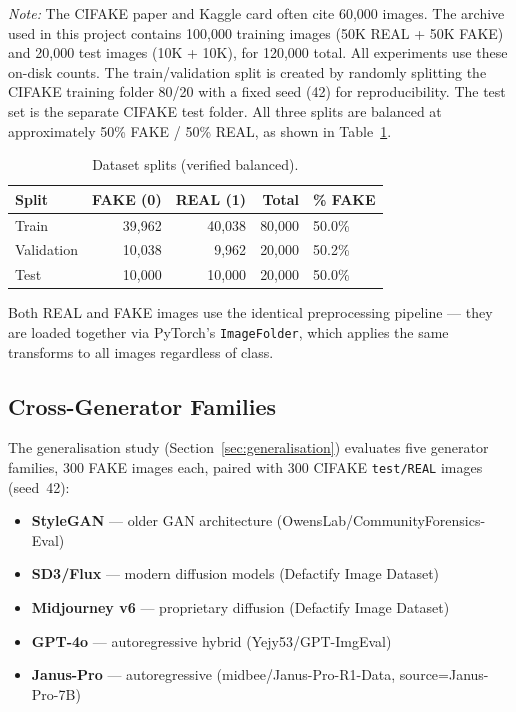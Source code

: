 \documentclass[12pt,a4paper]{article}
\begin{document}
\noindent\textit{Note:} The CIFAKE paper and Kaggle card often cite 60{,}000 images. The archive used in this project contains 100{,}000 training images (50K REAL + 50K FAKE) and 20{,}000 test images (10K + 10K), for 120{,}000 total. All experiments use these on-disk counts.
The train/validation split is created by randomly splitting the CIFAKE training folder 80/20 with a fixed seed (42) for reproducibility. The test set is the separate CIFAKE test folder. All three splits are balanced at approximately 50\% FAKE / 50\% REAL, as shown in Table~\ref{tab:splits}.

\begin{table}[H]
\centering
\caption{Dataset splits (verified balanced).}
\label{tab:splits}
\begin{tabular}{lrrrl}
\toprule
\textbf{Split} & \textbf{FAKE (0)} & \textbf{REAL (1)} & \textbf{Total} & \textbf{\% FAKE} \\
\midrule
Train      & 39,962 & 40,038 & 80,000 & 50.0\% \\
Validation & 10,038 &  9,962 & 20,000 & 50.2\% \\
Test       & 10,000 & 10,000 & 20,000 & 50.0\% \\
\bottomrule
\end{tabular}
\end{table}

Both REAL and FAKE images use the identical preprocessing pipeline --- they are loaded together via PyTorch's \texttt{ImageFolder}, which applies the same transforms to all images regardless of class.

\subsection{Cross-Generator Families}

The generalisation study (Section~\ref{sec:generalisation}) evaluates five generator families, 300 FAKE images each, paired with 300 CIFAKE \texttt{test/REAL} images (seed~42):

\begin{itemize}[noitemsep]
    \item \textbf{StyleGAN} --- older GAN architecture (OwensLab/CommunityForensics-Eval)
    \item \textbf{SD3/Flux} --- modern diffusion models (Defactify Image Dataset)
    \item \textbf{Midjourney v6} --- proprietary diffusion (Defactify Image Dataset)
    \item \textbf{GPT-4o} --- autoregressive hybrid (Yejy53/GPT-ImgEval)
    \item \textbf{Janus-Pro} --- autoregressive (midbee/Janus-Pro-R1-Data, source=Janus-Pro-7B)
\end{itemize}
\end{document}
